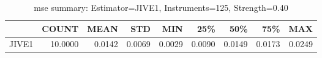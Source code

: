 \begin{table}[ht]
\centering
\caption{mse summary: Estimator=JIVE1, Instruments=125, Strength=0.40}
\begin{tabular}{lrrrrrrrr}
\toprule
 & COUNT & MEAN & STD & MIN & 25\% & 50\% & 75\% & MAX \\
\midrule
JIVE1 & 10.0000 & 0.0142 & 0.0069 & 0.0029 & 0.0090 & 0.0149 & 0.0173 & 0.0249 \\
\bottomrule
\end{tabular}
\end{table}
